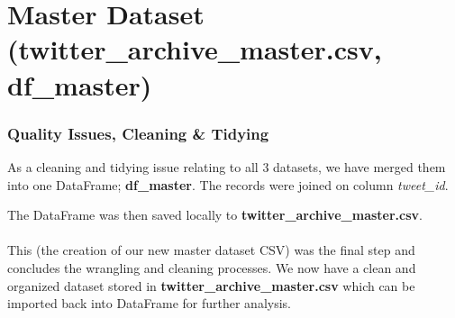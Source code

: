 \documentclass[10pt,a4paper]{report}
\begin{document}
\section{Master Dataset (\textbf{twitter\_archive\_master.csv}, \textbf{df\_master})}
	\subsubsection{Quality Issues, Cleaning \& Tidying}
	As a cleaning and tidying issue relating to all 3 datasets, we have merged them into one DataFrame; \textbf{df\_master}. The records were joined on column \textit{tweet\_id}.

	The DataFrame was then saved locally to  \textbf{twitter\_archive\_master.csv}. \\ \\ 


	This (the creation of our new master dataset CSV) was the final step and concludes the wrangling and cleaning processes. 
	We now have a clean and organized dataset stored in \textbf{twitter\_archive\_master.csv} which can be imported back into DataFrame for
	further analysis. 
\end{document}
